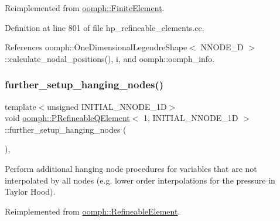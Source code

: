 Reimplemented from \hyperlink{classoomph_1_1FiniteElement_a9db1456b827131c21a991ac9fedf4b0c}{oomph\+::\+Finite\+Element}.



Definition at line 801 of file hp\+\_\+refineable\+\_\+elements.\+cc.



References oomph\+::\+One\+Dimensional\+Legendre\+Shape$<$ N\+N\+O\+D\+E\+\_\+D $>$\+::calculate\+\_\+nodal\+\_\+positions(), i, and oomph\+::oomph\+\_\+info.

\mbox{\label{classoomph_1_1PRefineableQElement_3_011_00_01INITIAL__NNODE__1D_01_4_aa83bd8186928d1e538e59ae7db831944}} 
\subsubsection{\texorpdfstring{further\+\_\+setup\+\_\+hanging\+\_\+nodes()}{further\_setup\_hanging\_nodes()}}
{\footnotesize\ttfamily template$<$unsigned I\+N\+I\+T\+I\+A\+L\+\_\+\+N\+N\+O\+D\+E\+\_\+1D$>$ \\
void \hyperlink{classoomph_1_1PRefineableQElement}{oomph\+::\+P\+Refineable\+Q\+Element}$<$ 1, I\+N\+I\+T\+I\+A\+L\+\_\+\+N\+N\+O\+D\+E\+\_\+1D $>$\+::further\+\_\+setup\+\_\+hanging\+\_\+nodes (\begin{DoxyParamCaption}{ }\end{DoxyParamCaption})\hspace{0.3cm}{\ttfamily [inline]}, {\ttfamily [virtual]}}



Perform additional hanging node procedures for variables that are not interpolated by all nodes (e.\+g. lower order interpolations for the pressure in Taylor Hood). 



Reimplemented from \hyperlink{classoomph_1_1RefineableElement_a86ea01c485f7ff822dce74b884312ccb}{oomph\+::\+Refineable\+Element}.




